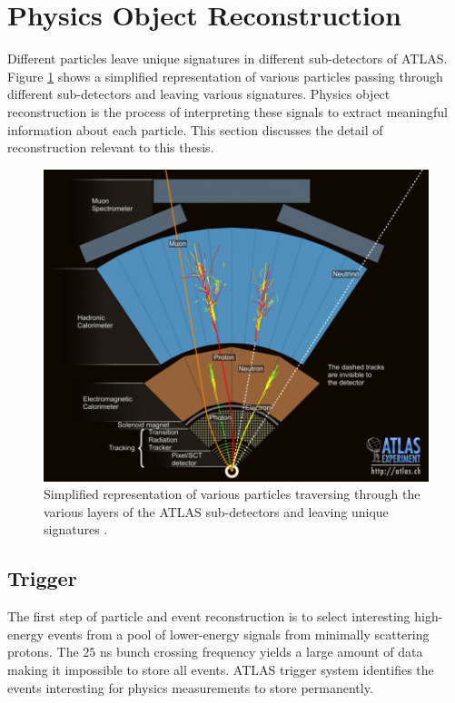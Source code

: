 \section{ Physics Object Reconstruction} 
\label{sec:ParticleReconstruction}
Different particles leave unique signatures in different sub-detectors of ATLAS. Figure \ref{fig:ATLASTransverse} shows a simplified representation of various particles passing through different sub-detectors and leaving various signatures. Physics object reconstruction is the process of interpreting these signals to extract meaningful information about each particle. This section discusses the detail of reconstruction relevant to this thesis. 

\begin{figure}[!htbp]
    \centering
    \includegraphics[width=.98\linewidth]{figures/LHC/ATLAS_Transverse.jpg}
    \caption{ Simplified representation of various particles traversing through the various layers of the ATLAS sub-detectors and leaving unique signatures \cite{ATLASTransverse}.\label{fig:ATLASTransverse}}
\end{figure}

\subsection{Trigger}
\label{subsec:TriggerATLAS}
The first step of particle and event reconstruction is to select interesting high-energy events from a pool of lower-energy signals from minimally scattering protons. The $25$ ns bunch crossing frequency yields a large amount of data making it impossible to store all events. ATLAS trigger system identifies the events interesting for physics measurements to store permanently. 


